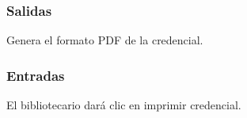 
\subsubsection{Salidas}
	\begin{Citemize}
		\item Genera el formato PDF de la credencial.
	\end{Citemize}
	
\subsubsection{Entradas}
	\begin{Citemize}
		\item El bibliotecario dará clic en imprimir credencial.
	\end{Citemize}
